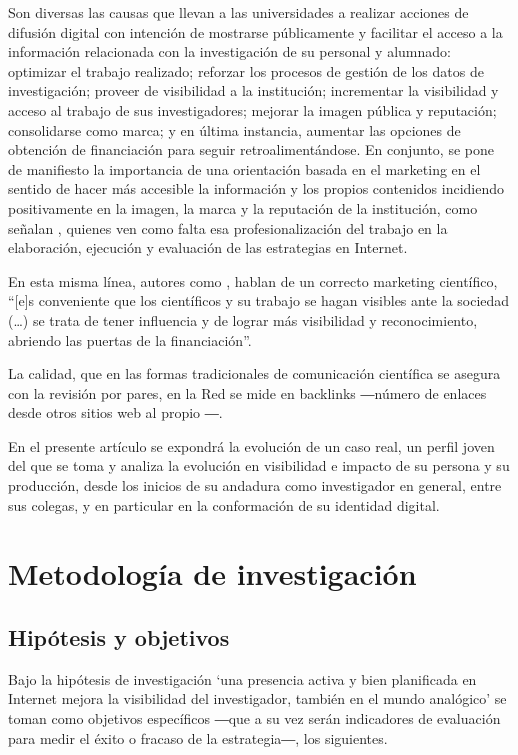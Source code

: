 \documentclass{textolivre}
\begin{document}
Son diversas las causas que llevan a las universidades a realizar acciones de difusión digital con intención de mostrarse públicamente y facilitar el acceso a la información relacionada con la investigación de su personal y alumnado: optimizar el trabajo realizado; reforzar los procesos de gestión de los datos de investigación; proveer de visibilidad a la institución; incrementar la visibilidad y acceso al trabajo de sus investigadores; mejorar la imagen pública y reputación; consolidarse como marca; y en última instancia, aumentar las opciones de obtención de financiación para seguir retroalimentándose. En conjunto, se pone de manifiesto la importancia de una orientación basada en el marketing en el sentido de hacer más accesible la información y los propios contenidos incidiendo positivamente en la imagen, la marca y la reputación de la institución, como señalan \textcite{siso_calvo_estrategias_2018}, quienes ven como falta esa profesionalización del trabajo en la elaboración, ejecución y evaluación de las estrategias en Internet.

En esta misma línea, autores como \textcite[p. 5]{segui_simarro_estrategias_2015}, hablan de un correcto marketing científico, “[e]s conveniente que los científicos y su trabajo se hagan visibles ante la sociedad (…) se trata de tener influencia y de lograr más visibilidad y reconocimiento, abriendo las puertas de la financiación”.

La calidad, que en las formas tradicionales de comunicación científica se asegura con la revisión por pares, en la Red se mide en backlinks ―número de enlaces desde otros sitios web al propio \cite{lopezosa_off-page_2019}―.

En el presente artículo se expondrá la evolución de un caso real, un perfil joven del que se toma y analiza la evolución en visibilidad e impacto de su persona y su producción, desde los inicios de su andadura como investigador en general, entre sus colegas, y en particular en la conformación de su identidad digital.

\section{Metodología de investigación}\label{sec-metodologia}
\subsection{Hipótesis y objetivos}\label{sec-hipoteses}
Bajo la hipótesis de investigación ‘una presencia activa y bien planificada en Internet mejora la visibilidad del investigador, también en el mundo analógico’ se toman como objetivos específicos ―que a su vez serán indicadores de evaluación para medir el éxito o fracaso de la estrategia―, los siguientes.
\end{document}
